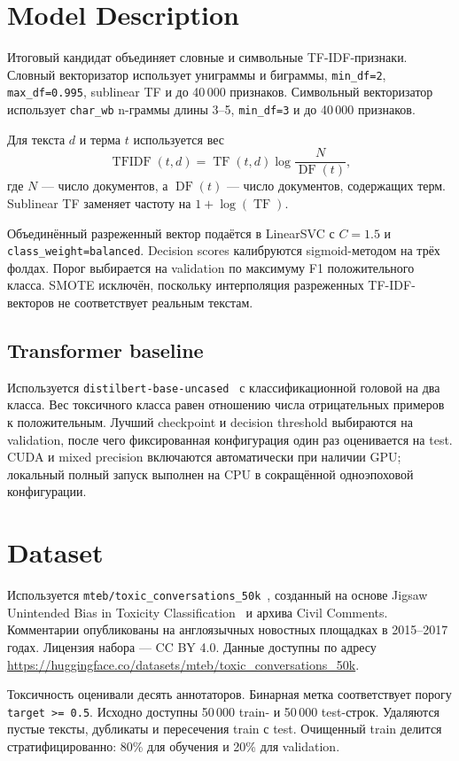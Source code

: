 \documentclass{article}
\begin{document}
\section{Model Description}
Итоговый кандидат объединяет словные и символьные TF-IDF-признаки. Словный
векторизатор использует униграммы и биграммы, \texttt{min\_df=2},
\texttt{max\_df=0.995}, sublinear TF и до 40\,000 признаков. Символьный
векторизатор использует \texttt{char\_wb} n-граммы длины 3--5,
\texttt{min\_df=3} и до 40\,000 признаков.

Для текста $d$ и терма $t$ используется вес
\[
\operatorname{TFIDF}(t,d)=\operatorname{TF}(t,d)
\log\frac{N}{\operatorname{DF}(t)},
\]
где $N$ --- число документов, а $\operatorname{DF}(t)$ --- число документов,
содержащих терм. Sublinear TF заменяет частоту на $1+\log(\operatorname{TF})$.

Объединённый разреженный вектор подаётся в LinearSVC с $C=1.5$ и
\texttt{class\_weight=balanced}. Decision scores калибруются sigmoid-методом на
трёх фолдах. Порог выбирается на validation по максимуму F1 положительного
класса. SMOTE исключён, поскольку интерполяция разреженных TF-IDF-векторов не
соответствует реальным текстам.

\subsection{Transformer baseline}
Используется \texttt{distilbert-base-uncased}~\cite{sanh2019distilbert} с
классификационной головой на два класса. Вес токсичного класса равен отношению
числа отрицательных примеров к положительным. Лучший checkpoint и decision
threshold выбираются на validation, после чего фиксированная конфигурация один
раз оценивается на test. CUDA и mixed precision включаются автоматически при
наличии GPU; локальный полный запуск выполнен на CPU в сокращённой одноэпоховой
конфигурации.

\section{Dataset}
Используется \texttt{mteb/toxic\_conversations\_50k}~\cite{mtebdataset},
созданный на основе Jigsaw Unintended Bias in Toxicity
Classification~\cite{jigsaw2019unintended} и архива
Civil Comments. Комментарии опубликованы на англоязычных новостных площадках в
2015--2017 годах. Лицензия набора --- CC BY 4.0. Данные доступны по адресу
\url{https://huggingface.co/datasets/mteb/toxic_conversations_50k}.

Токсичность оценивали десять аннотаторов. Бинарная метка соответствует порогу
\texttt{target >= 0.5}. Исходно доступны 50\,000 train- и 50\,000 test-строк.
Удаляются пустые тексты, дубликаты и пересечения train с test. Очищенный train
делится стратифицированно: 80\% для обучения и 20\% для validation.
\end{document}

